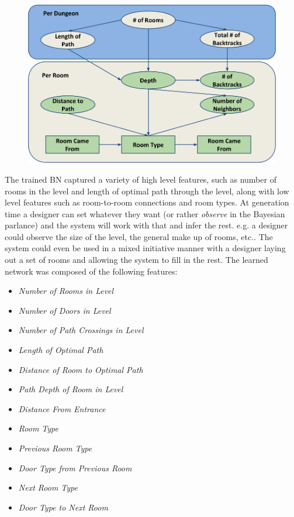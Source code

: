 \documentclass[a4paper]{article}
\begin{document}
\begin{figure}[ht]
\centering
  \includegraphics[width=1\linewidth]{figures/The_Learning_of_Zelda.png}
  \caption{}
  \label{fig:BN}
\end{figure}
The trained BN captured a variety of high level features, such as number of rooms in the level and length of optimal path through the level, along with low level features such as room-to-room connections and room types.    At generation time a designer can set whatever they want (or rather \textit{observe} in the Bayesian parlance) and the system will work with that and infer the rest.  e.g. a designer could observe the size of the level, the general make up of rooms, etc..  The system could even be used in a mixed initiative manner with a designer laying out a set of rooms and allowing the system to fill in the rest.  The learned network was composed of the following features:
\begin{itemize}
\item \textit{Number of Rooms in Level}
\item \textit{Number of Doors in Level}
\item \textit{Number of Path Crossings in Level}
\item \textit{Length of Optimal Path}
\item \textit{Distance of Room to Optimal Path}
\item \textit{Path Depth of Room in Level}
\item \textit{Distance From Entrance}
\item \textit{Room Type}
\item \textit{Previous Room Type}
\item \textit{Door Type from Previous Room}
\item \textit{Next Room Type}
\item \textit{Door Type to Next Room}
\end{itemize}
\end{document}
